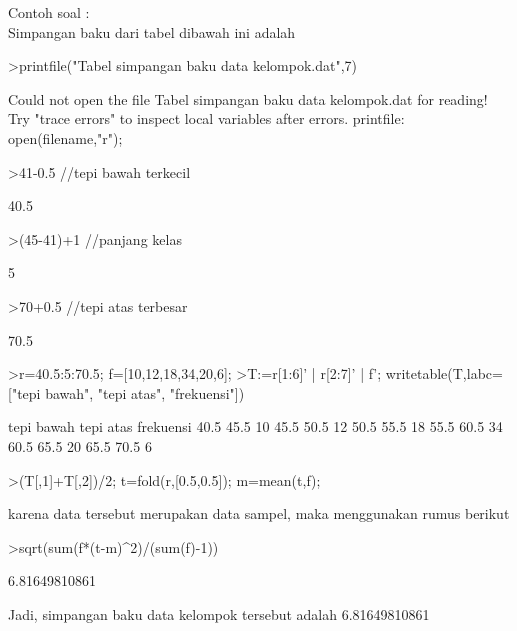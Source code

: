 \documentclass[a4paper,10pt]{article}
\begin{document}
\begin{eulernotebook}
\begin{eulercomment}
\begin{eulercomment}
\begin{eulercomment}
\begin{eulercomment}
\begin{eulercomment}
\begin{eulercomment}
\begin{eulercomment}
\begin{eulercomment}
\begin{eulercomment}
\begin{eulercomment}
\begin{eulercomment}
Contoh soal :\\
Simpangan baku dari tabel dibawah ini adalah
\end{eulercomment}
\begin{eulerprompt}
>printfile("Tabel simpangan baku data kelompok.dat",7)
\end{eulerprompt}
\begin{euleroutput}
  Could not open the file
  Tabel simpangan baku data kelompok.dat
  for reading!
  Try "trace errors" to inspect local variables after errors.
  printfile:
      open(filename,"r");
\end{euleroutput}
\begin{eulerprompt}
>41-0.5 //tepi bawah terkecil
\end{eulerprompt}
\begin{euleroutput}
  40.5
\end{euleroutput}
\begin{eulerprompt}
>(45-41)+1 //panjang kelas
\end{eulerprompt}
\begin{euleroutput}
  5
\end{euleroutput}
\begin{eulerprompt}
>70+0.5 //tepi atas terbesar
\end{eulerprompt}
\begin{euleroutput}
  70.5
\end{euleroutput}
\begin{eulerprompt}
>r=40.5:5:70.5; f=[10,12,18,34,20,6];
>T:=r[1:6]' | r[2:7]' | f'; writetable(T,labc=["tepi bawah", "tepi atas", "frekuensi"])
\end{eulerprompt}
\begin{euleroutput}
   tepi bawah tepi atas frekuensi
         40.5      45.5        10
         45.5      50.5        12
         50.5      55.5        18
         55.5      60.5        34
         60.5      65.5        20
         65.5      70.5         6
\end{euleroutput}
\begin{eulerprompt}
>(T[,1]+T[,2])/2; t=fold(r,[0.5,0.5]); m=mean(t,f);
\end{eulerprompt}
\begin{eulercomment}
karena data tersebut merupakan data sampel, maka menggunakan rumus
berikut
\end{eulercomment}
\begin{eulerprompt}
>sqrt(sum(f*(t-m)^2)/(sum(f)-1))
\end{eulerprompt}
\begin{euleroutput}
  6.81649810861
\end{euleroutput}
\begin{eulercomment}
Jadi, simpangan baku data kelompok tersebut adalah 6.81649810861


\end{eulercomment}
\end{eulercomment}
\end{eulercomment}
\end{eulercomment}
\end{eulercomment}
\end{eulercomment}
\end{eulercomment}
\end{eulercomment}
\end{eulercomment}
\end{eulercomment}
\end{eulercomment}
\end{eulernotebook}
\end{document}
